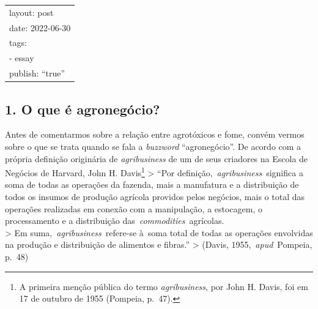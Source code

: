 \documentclass[12pt]{article}
\title{}
\author{}
\date{}
\numberwithin{equation}{section}
\theoremstyle{plain}
\theoremstyle{definition}
\theoremstyle{remark}
\begin{document}
\maketitle

\begin{longtable}[]{@{}l@{}}
\toprule\noalign{}
\endhead
\bottomrule\noalign{}
\endlastfoot
layout: post \\
date: 2022-06-30 \\
tags: \\
- essay \\
publish: ``true'' \\
\end{longtable}

\hypertarget{o-que-uxe9-agroneguxf3cio}{%
\subsection{1. O que é agronegócio?}\label{o-que-uxe9-agroneguxf3cio}}

Antes de comentarmos sobre a relação entre agrotóxicos e fome, convém vermos sobre o que se trata quando se fala a \textit{buzzword} ``agronegócio''. De acordo com a própria definição originária de \textit{agribusiness} de um de seus criadores na Escola de Negócios de Harvard, John H. Davis\footnote{A primeira menção pública do termo \textit{agribusiness}, por John H. Davis, foi em 17 de outubro de 1955 (Pompeia, p.~47).} \textgreater{} ``Por definição,~\textit{agribusiness}~significa a soma de todas as operações da fazenda, mais a manufatura e a distribuição de todos os insumos de produção agrícola providos pelos negócios, mais o total das operações realizadas em conexão com a manipulação, a estocagem, o processamento e a distribuição das~\textit{commodities}~agrícolas.\\
\textgreater{} Em suma,~\textit{agribusiness}~refere-se à~soma total de todas as operações envolvidas na produção e distribuição de alimentos e fibras.'' \textgreater{} (Davis, 1955,~\textit{apud}~Pompeia, p.~48)
\end{document}
